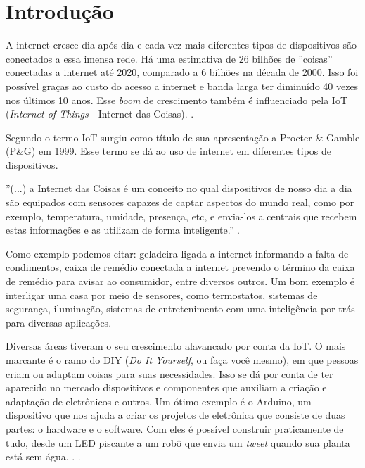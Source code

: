 \chapter{Introdução}\label{cap:introducao}

A internet cresce dia após dia e cada vez mais diferentes tipos de dispositivos são conectados a essa imensa rede. Há uma estimativa de 26 bilhões de ''coisas'' conectadas a internet até 2020, comparado a 6 bilhões na década de 2000. Isso foi possível graças ao custo do acesso a internet e banda larga ter diminuído 40 vezes nos últimos 10 anos. Esse \textit{boom} de crescimento também é influenciado pela IoT (\textit{Internet of Things} - Internet das Coisas). \cite{goldmansachs-iot}. 

Segundo  o termo IoT surgiu como título de sua apresentação a Procter \& Gamble (P\&G) em 1999. Esse termo se dá ao uso de internet em diferentes tipos de dispositivos. 

\begin{citacao}
''(...) a Internet das Coisas é um conceito no qual dispositivos de nosso dia a dia são equipados com sensores capazes de captar aspectos do mundo real, como por exemplo, temperatura, umidade, presença, etc, e envia-los a centrais que recebem estas informações e as utilizam de forma inteligente.'' \cite{nascimento-iot}.
\end{citacao}

Como exemplo podemos citar: geladeira ligada a internet informando a falta de condimentos, caixa de remédio conectada a internet prevendo o término da caixa de remédio para avisar ao consumidor, entre diversos outros. Um bom exemplo é interligar uma casa por meio de sensores, como termostatos, sistemas de segurança, iluminação, sistemas de entretenimento com uma inteligência por trás para diversas aplicações. \cite{goldmansachs-iot}

Diversas áreas tiveram o seu crescimento alavancado por conta da IoT. O mais marcante é o ramo do DIY (\textit{Do It Yourself}, ou faça você mesmo), em que pessoas criam ou adaptam coisas para suas necessidades. Isso se dá por conta de ter aparecido no mercado dispositivos e componentes que auxiliam a criação e adaptação de eletrônicos e outros. Um ótimo exemplo é o Arduino, um dispositivo que nos ajuda a criar os projetos de eletrônica que consiste de duas partes: o hardware e o software. Com eles é possível construir praticamente de tudo, desde um LED piscante a um robô que envia um \textit{tweet} quando sua planta está sem água. \cite{ben-arduino}. \cite{sorrel-arduino}.


